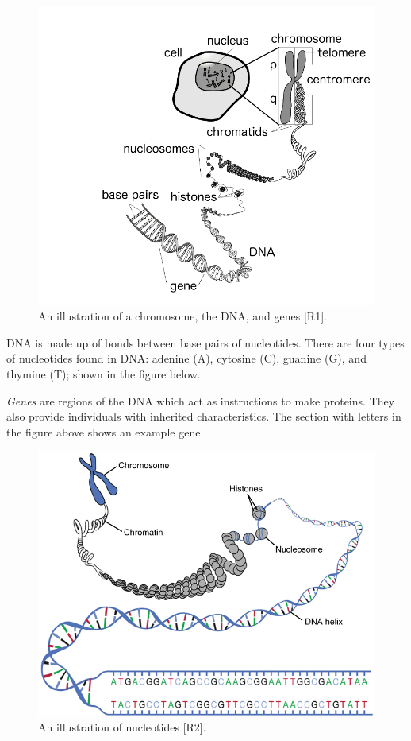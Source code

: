 \documentclass[
]{article}
\begin{document}
\begin{figure}
\centering
\includegraphics{images/genes_diagram.png}
\caption{An illustration of a chromosome, the DNA, and genes {[}R1{]}.}
\end{figure}

DNA is made up of bonds between base pairs of nucleotides. There are
four types of nucleotides found in DNA: adenine (A), cytosine (C),
guanine (G), and thymine (T); shown in the figure below.

\textit{Genes} are regions of the DNA which act as instructions to make
proteins. They also provide individuals with inherited characteristics.
The section with letters in the figure above shows an example gene.

\begin{figure}
\centering
\includegraphics{images/nucleotides.jpg}
\caption{An illustration of nucleotides {[}R2{]}.}
\end{figure}
\end{document}
